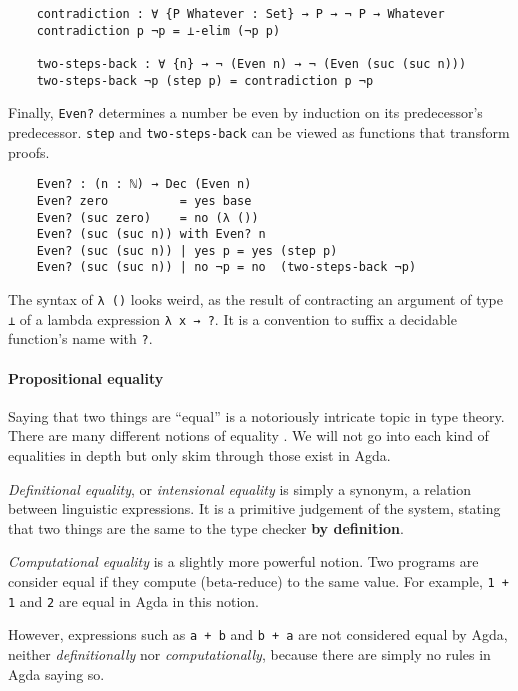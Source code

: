 \documentclass[\main/thesis.tex]{subfiles}
\begin{document}
\begin{lstlisting}
    contradiction : ∀ {P Whatever : Set} → P → ¬ P → Whatever
    contradiction p ¬p = ⊥-elim (¬p p)

    two-steps-back : ∀ {n} → ¬ (Even n) → ¬ (Even (suc (suc n)))
    two-steps-back ¬p (step p) = contradiction p ¬p
\end{lstlisting}

Finally, {\lstinline|Even?|} determines a number be even by induction on its
predecessor's predecessor. {\lstinline|step|} and {\lstinline|two-steps-back|}
can be viewed as functions that transform proofs.

\begin{lstlisting}
    Even? : (n : ℕ) → Dec (Even n)
    Even? zero          = yes base
    Even? (suc zero)    = no (λ ())
    Even? (suc (suc n)) with Even? n
    Even? (suc (suc n)) | yes p = yes (step p)
    Even? (suc (suc n)) | no ¬p = no  (two-steps-back ¬p)
\end{lstlisting}

The syntax of {\lstinline|λ ()|} looks weird, as the result of contracting
an argument of type {\lstinline|⊥|} of a lambda expression {\lstinline|λ x → ?|}.
It is a convention to suffix a decidable function's name with {\lstinline|?|}.

\paragraph{Propositional equality}

Saying that two things are ``equal'' is a notoriously intricate topic in type theory.
There are many different notions of equality \cite{equality}.
We will not go into each kind of equalities in depth but only skim through those exist in Agda.

\textit{Definitional equality}, or \textit{intensional equality} is simply a
synonym, a relation between linguistic expressions. It is a primitive judgement
of the system, stating that two things are the same to the type checker
\textbf{by definition}.

\textit{Computational equality} is a slightly more powerful notion.
Two programs are consider equal if they compute (beta-reduce) to the same value.
For example, {\lstinline|1 + 1|} and {\lstinline|2|} are equal in Agda in this notion.

However, expressions such as {\lstinline|a + b|} and {\lstinline|b + a|} are not
considered equal by Agda, neither \textit{definitionally} nor \textit{computationally},
because there are simply no rules in Agda saying so.
\end{document}
